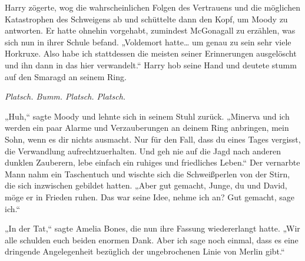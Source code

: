 Harry zögerte, wog die wahrscheinlichen Folgen des Vertrauens und die möglichen Katastrophen des Schweigens ab und schüttelte dann den Kopf, um Moody zu antworten. Er hatte ohnehin vorgehabt, zumindest McGonagall zu erzählen, was sich nun in ihrer Schule befand.
„Voldemort hatte… um genau zu sein sehr viele Horkruxe. Also habe ich stattdessen die meisten seiner Erinnerungen ausgelöscht und ihn dann in das hier verwandelt.“
Harry hob seine Hand und deutete stumm auf den Smaragd an seinem Ring.

\emph{Platsch. Bumm. Platsch. Platsch.}

„Huh,“ sagte Moody und lehnte sich in seinem Stuhl zurück. „Minerva und ich werden ein paar Alarme und Verzauberungen an deinem Ring anbringen, mein Sohn, wenn es dir nichts ausmacht. Nur für den Fall, dass du eines Tages vergisst, die Verwandlung aufrechtzuerhalten. Und geh nie auf die Jagd nach anderen dunklen Zauberern, lebe einfach ein ruhiges und friedliches Leben.“
Der vernarbte Mann nahm ein Taschentuch und wischte sich die Schweißperlen von der Stirn, die sich inzwischen gebildet hatten.
„Aber gut gemacht, Junge, du und David, möge er in Frieden ruhen. Das war seine Idee, nehme ich an? Gut gemacht, sage ich.“

„In der Tat,“ sagte Amelia Bones, die nun ihre Fassung wiedererlangt hatte.
„Wir alle schulden euch beiden enormen Dank. Aber ich sage noch einmal, dass es eine dringende Angelegenheit bezüglich der ungebrochenen Linie von Merlin gibt.“


